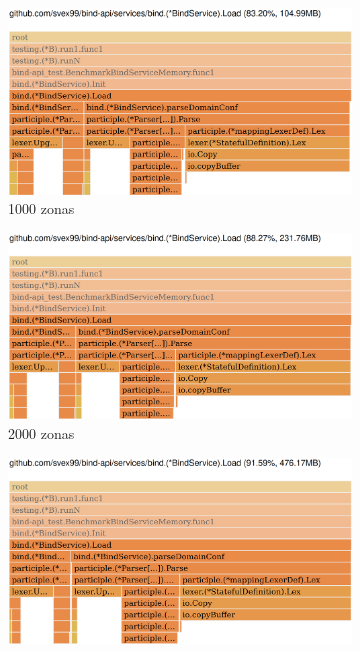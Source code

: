 \begin{figure}
    \hfill
    \begin{subfigure}{0.49\textwidth}
        \includegraphics[width=\textwidth]{Graphics/mem1000z.png}
        \caption{1000 zonas}
    \end{subfigure}
    \hfill
    \begin{subfigure}{0.49\textwidth}
        \includegraphics[width=\textwidth]{Graphics/mem2000z.png}
        \caption{2000 zonas}
    \end{subfigure}
    \hfill
    \begin{subfigure}{0.49\textwidth}
        \includegraphics[width=\textwidth]{Graphics/mem4000z.png}

\end{subfigure}
\end{figure}
